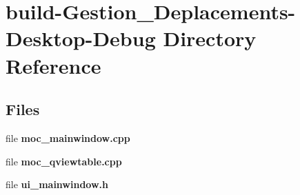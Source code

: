 \section{build-\/\-Gestion\-\_\-\-Deplacements-\/\-Desktop-\/\-Debug Directory Reference}
\label{dir_b30c30739b2732d1847e5ee0b3b26eb5}
\subsection*{Files}
\begin{DoxyCompactItemize}
\item 
file {\bfseries moc\-\_\-mainwindow.\-cpp}
\item 
file {\bfseries moc\-\_\-qviewtable.\-cpp}
\item 
file {\bfseries ui\-\_\-mainwindow.\-h}
\end{DoxyCompactItemize}

